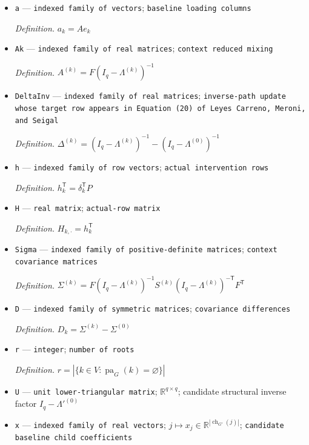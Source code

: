 \documentclass{article}
\begin{document}
\begin{itemize}
  \par\smallskip\noindent\emph{Definition.} \(A=FP\)
  \item \texttt{a} --- \texttt{indexed family of vectors}; \texttt{baseline loading columns}
  \par\smallskip\noindent\emph{Definition.} \(a_k=Ae_k\)
  \item \texttt{Ak} --- \texttt{indexed family of real matrices}; \texttt{context reduced mixing}
  \par\smallskip\noindent\emph{Definition.} \(A^{(k)}=F(I_q-\Lambda^{(k)})^{-1}\)
  \item \texttt{DeltaInv} --- \texttt{indexed family of real matrices}; \texttt{inverse-\allowbreak{}path update whose target row appears in Equation (20) of Leyes Carreno,\allowbreak{} Meroni,\allowbreak{} and Seigal}
  \par\smallskip\noindent\emph{Definition.} \(\Delta^{(k)}=(I_q-\Lambda^{(k)})^{-1}-(I_q-\Lambda^{(0)})^{-1}\)
  \item \texttt{h} --- \texttt{indexed family of row vectors}; \texttt{actual intervention rows}
  \par\smallskip\noindent\emph{Definition.} \(h_k^{\mathsf T}=\delta_k^{\mathsf T}P\)
  \item \texttt{H} --- \texttt{real matrix}; \texttt{actual-\allowbreak{}row matrix}
  \par\smallskip\noindent\emph{Definition.} \(H_{k,\cdot}=h_k^{\mathsf T}\)
  \item \texttt{Sigma} --- \texttt{indexed family of positive-\allowbreak{}definite matrices}; \texttt{context covariance matrices}
  \par\smallskip\noindent\emph{Definition.} \(\Sigma^{(k)}=F(I_q-\Lambda^{(k)})^{-1}S^{(k)}(I_q-\Lambda^{(k)})^{-\mathsf T}F^{\mathsf T}\)
  \item \texttt{D} --- \texttt{indexed family of symmetric matrices}; \texttt{covariance differences}
  \par\smallskip\noindent\emph{Definition.} \(D_k=\Sigma^{(k)}-\Sigma^{(0)}\)
  \item \texttt{r} --- \texttt{integer}; \texttt{number of roots}
  \par\smallskip\noindent\emph{Definition.} \(r=|\{k\in V:\operatorname{pa}_{G}(k)=\varnothing\}|\)
  \item \texttt{U} --- \texttt{unit lower-\allowbreak{}triangular matrix}; \(\mathbb{R}^{q\times q}\); candidate structural inverse factor \(I_q-\Lambda'^{(0)}\)
  \item \texttt{x} --- \texttt{indexed family of real vectors}; \(j\mapsto x_j\in\mathbb{R}^{|\operatorname{ch}_{G'}(j)|}\); \texttt{candidate baseline child coefficients}

\end{itemize}
\end{document}
